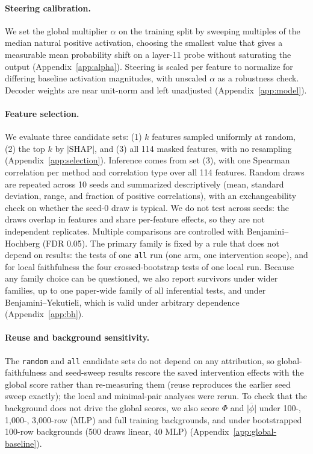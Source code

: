 \paragraph{Steering calibration.}\label{para:steering_calibration} We set the global multiplier $\alpha$ on the training split by sweeping multiples of the median natural positive activation, choosing the smallest value that gives a measurable mean probability shift on a layer-11 probe without saturating the output (Appendix~\ref{app:alpha}). Steering is scaled per feature to normalize for differing baseline activation magnitudes, with unscaled $\alpha$ as a robustness check. Decoder weights are near unit-norm and left unadjusted (Appendix~\ref{app:model}).

\paragraph{Feature selection.} We evaluate three candidate sets: (1) $k$ features sampled uniformly at random, (2) the top $k$ by $|\text{SHAP}|$, and (3) all 114 masked features, with no resampling (Appendix~\ref{app:selection}). Inference comes from set (3), with one Spearman correlation per method and correlation type over all 114 features. Random draws are repeated across 10 seeds and summarized descriptively (mean, standard deviation, range, and fraction of positive correlations), with an exchangeability check on whether the seed-0 draw is typical. We do not test across seeds: the draws overlap in features and share per-feature effects, so they are not independent replicates. Multiple comparisons are controlled with Benjamini--Hochberg (FDR 0.05). The primary family is fixed by a rule that does not depend on results: the tests of one \texttt{all} run (one arm, one intervention scope), and for local faithfulness the four crossed-bootstrap tests of one local run. Because any family choice can be questioned, we also report survivors under wider families, up to one paper-wide family of all inferential tests, and under Benjamini--Yekutieli, which is valid under arbitrary dependence (Appendix~\ref{app:bh}).

\paragraph{Reuse and background sensitivity.} The \texttt{random} and \texttt{all} candidate sets do not depend on any attribution, so global-faithfulness and seed-sweep results rescore the saved intervention effects with the global score rather than re-measuring them (reuse reproduces the earlier seed sweep exactly); the local and minimal-pair analyses were rerun. To check that the background does not drive the global scores, we also score $\Phi$ and $\overline{|\phi|}$ under 100-, 1{,}000-, 3{,}000-row (MLP) and full training backgrounds, and under bootstrapped 100-row backgrounds (500 draws linear, 40 MLP) (Appendix~\ref{app:global-baseline}).

